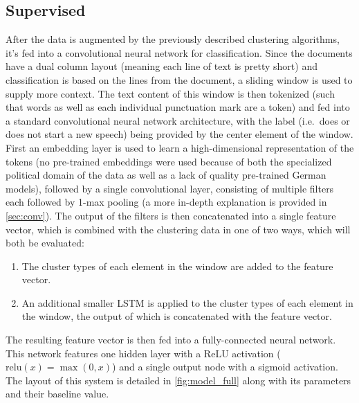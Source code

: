 \subsection{Supervised}%
\label{sec:sup}
After the data is augmented by the previously described clustering algorithms,
it's fed into a convolutional neural network for classification. Since the
documents have a dual column layout (meaning each line of text is pretty short)
and classification is based on the lines from the document, a sliding window is
used to supply more context. The text content of this window is then tokenized
(such that words as well as each individual punctuation mark are a token)
and fed into a standard convolutional neural network
architecture\citep{kim2014conv}, with the label (i.e.\ does or does not start a
new speech) being provided by the center element of the window.
First an embedding layer is used to learn a high-dimensional representation of
the tokens (no pre-trained embeddings were used because of both the specialized
political domain of the data as well as a lack of quality pre-trained German
models), followed by a single convolutional layer, consisting of multiple
filters each followed by 1-max pooling (a more in-depth explanation is provided
in \cref{sec:conv}). The output of the filters is then concatenated into a
single feature vector, which is combined with the clustering data in one of two
ways, which will both be evaluated:
\begin{enumerate}
  \item The cluster types of each element in the window are added to the
    feature vector.
  \item An additional smaller LSTM is applied to the cluster types of each
    element in the window, the output of which is concatenated with the feature
    vector.
\end{enumerate}
The resulting feature vector is then fed into a fully-connected neural network.
This network features one hidden layer with a ReLU activation ($\mathrm{relu}(x)
= \max(0, x)$) and a single output node with a sigmoid activation. The layout of
this system is detailed in \cref{fig:model_full} along with its parameters and
their baseline value.

